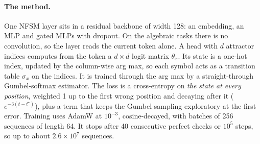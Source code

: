 \documentclass[11pt]{article}
\begin{document}
\paragraph{The method.} One NFSM layer sits in a residual backbone of width 128: an embedding, an
MLP and gated MLPs with dropout. On the algebraic tasks there is no convolution, so the layer reads
the current token alone. A head with $d$ attractor indices computes from the token a $d \times d$
logit matrix $\theta_x$. Its state is a one-hot index, updated by the column-wise arg max, so each
symbol acts as a transition table $\sigma_x$ on the indices. It is trained through the arg max by a
straight-through Gumbel-softmax estimator. The loss is a cross-entropy on \emph{the state at every
position}, weighted 1 up to the first wrong position and decaying after it ($e^{-3(t - t^\star)}$),
plus a term that keeps the Gumbel sampling exploratory at the first error. Training uses AdamW at
$10^{-3}$, cosine-decayed, with batches of 256 sequences of length 64. It stops after 40 consecutive
perfect checks or $10^5$ steps, so up to about $2.6 \times 10^7$ sequences.
\end{document}
